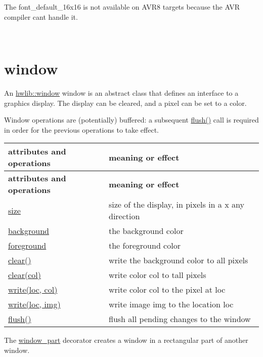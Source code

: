 The font\+\_\+default\+\_\+16x16 is not available on A\+V\+R8 targets because the A\+VR compiler can\textquotesingle{}t handle it.

~\newline
 

\hypertarget{graphics_window}{}\section{window}\label{graphics_window}
An \hyperlink{classhwlib_1_1window}{hwlib\+::window} window is an abstract class that defines an interface to a graphics display. The display can be cleared, and a pixel can be set to a color.

Window operations are (potentially) buffered\+: a subsequent \hyperlink{classhwlib_1_1window_a2b654a98872d174173e1df24a444c949}{flush()} call is required in order for the previous operations to take effect.

\tabulinesep=1mm
\begin{longtabu} spread 0pt [c]{*{2}{|X[-1]}|}
\hline
\rowcolor{\tableheadbgcolor}\textbf{ attributes and operations }&\textbf{ meaning or effect  }\\
\endfirsthead
\hline
\endfoot
\hline
\rowcolor{\tableheadbgcolor}\textbf{ attributes and operations }&\textbf{ meaning or effect  }\\
\endhead
\hyperlink{classhwlib_1_1window_ad2ad5281c9c09d18010b19cb807d3eaa}{size} &size of the display, in pixels in a x any direction \\
\hyperlink{classhwlib_1_1window_a1ca47e79ec54ea8b2f38b41b42593d2d}{background} &the background color \\
\hyperlink{classhwlib_1_1window_a812e3bf440309bf3280d34fa04eeb718}{foreground} &the foreground color \\
\hyperlink{classhwlib_1_1window_a5e781163353ce26cb4dc5b2cbe40ad05}{clear()} &write the background color to all pixels \\
\hyperlink{classhwlib_1_1window_a5e781163353ce26cb4dc5b2cbe40ad05}{clear(col)} &write color col to tall pixels \\
\hyperlink{classhwlib_1_1window_a65122042afeb55e41e5c03b5c8e26fff}{write(loc, col)} &write color col to the pixel at loc \\
\hyperlink{classhwlib_1_1window_a65122042afeb55e41e5c03b5c8e26fff}{write(loc, img)} &write image img to the location loc \\
\hyperlink{classhwlib_1_1window_a2b654a98872d174173e1df24a444c949}{flush()} &flush all pending changes to the window \\
\end{longtabu}
The \hyperlink{classhwlib_1_1window__part}{window\+\_\+part} decorator creates a window in a rectangular part of another window.

